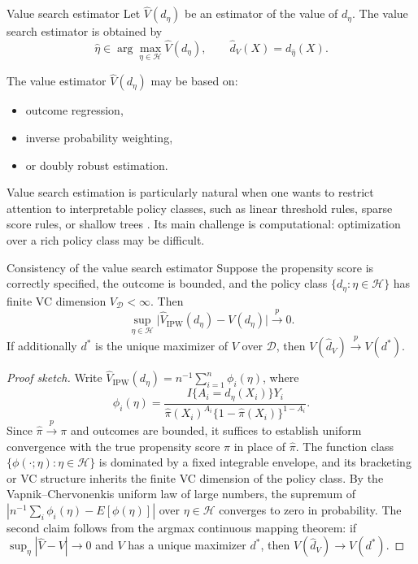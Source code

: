 \documentclass[master.tex]{subfiles}
\begin{document}
\begin{defn}{Value search estimator}
\label{w14:defn:valuesearch}
Let \(\widehat V(d_\eta)\) be an estimator of the value of \(d_\eta\). The value search estimator is obtained by
\[
\hat\eta\in\arg\max_{\eta\in\mathcal H}\widehat V(d_\eta),
\qquad
\hat d_V(X)=d_{\hat\eta}(X).
\]
\end{defn}

The value estimator \(\widehat V(d_\eta)\) may be based on:
\begin{itemize}
    \item outcome regression,
    \item inverse probability weighting,
    \item or doubly robust estimation.
\end{itemize}

\begin{remark}
Value search estimation is particularly natural when one wants to restrict attention to interpretable policy classes, such as linear threshold rules, sparse score rules, or shallow trees \citep{qian2011performance}. Its main challenge is computational: optimization over a rich policy class may be difficult.
\end{remark}

\begin{prop}{Consistency of the value search estimator}
\label{w14:prop:valuesearch-consist}
Suppose the propensity score is correctly specified, the outcome is bounded,
and the policy class \(\{d_\eta:\eta\in\mathcal H\}\) has finite
VC dimension \(V_{\mathcal D}<\infty\). Then
\[
\sup_{\eta\in\mathcal H}
\bigl|\widehat V_{\mathrm{IPW}}(d_\eta)-V(d_\eta)\bigr|
\xrightarrow{p}0.
\]
If additionally \(d^\ast\) is the unique maximizer of \(V\) over \(\mathcal D\),
then \(V(\hat d_V)\xrightarrow{p}V(d^\ast)\).
\end{prop}

\begin{proof}[Proof sketch]
Write \(\widehat V_{\mathrm{IPW}}(d_\eta)=n^{-1}\sum_{i=1}^n\phi_i(\eta)\),
where
\[
\phi_i(\eta)
=\frac{I\{A_i=d_\eta(X_i)\}Y_i}{\hat\pi(X_i)^{A_i}\{1-\hat\pi(X_i)\}^{1-A_i}}.
\]
Since \(\hat\pi\xrightarrow{p}\pi\) and outcomes are bounded, it suffices to
establish uniform convergence with the true propensity score \(\pi\) in place
of \(\hat\pi\). The function class
\(\{\phi(\cdot;\eta):\eta\in\mathcal H\}\) is dominated by a fixed integrable
envelope, and its bracketing or VC structure inherits the finite VC dimension
of the policy class. By the Vapnik--Chervonenkis uniform law of large numbers,
the supremum of \(|n^{-1}\sum_i\phi_i(\eta)-E[\phi(\eta)]|\) over
\(\eta\in\mathcal H\) converges to zero in probability. The second claim
follows from the argmax continuous mapping theorem: if \(\sup_\eta|\widehat
V-V|\to 0\) and \(V\) has a unique maximizer \(d^\ast\), then
\(V(\hat d_V)\to V(d^\ast)\).
\end{proof}
\end{document}

